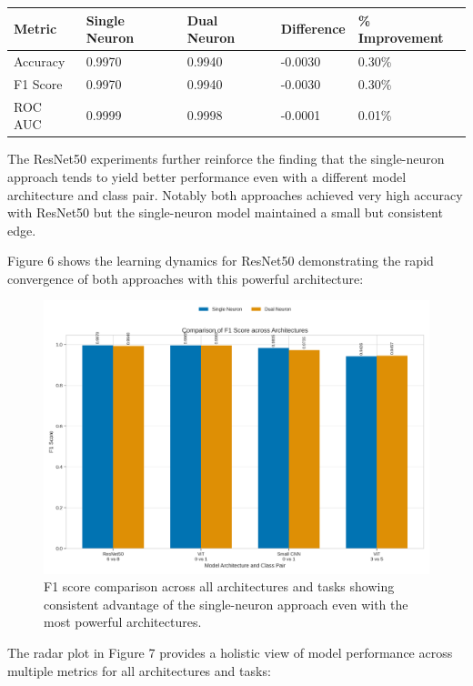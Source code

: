 \documentclass[11pt]{article}
\begin{document}
\begin{tabular}{lllll}
\hline
Metric & Single Neuron & Dual Neuron & Difference & \% Improvement \\
\hline
Accuracy & 0.9970 & 0.9940 & -0.0030 & 0.30\% \\
F1 Score & 0.9970 & 0.9940 & -0.0030 & 0.30\% \\
ROC AUC & 0.9999 & 0.9998 & -0.0001 & 0.01\% \\
\hline
\end{tabular}

The ResNet50 experiments further reinforce the finding that the single-neuron approach tends to yield better performance even with a different model architecture and class pair. Notably both approaches achieved very high accuracy with ResNet50 but the single-neuron model maintained a small but consistent edge.

Figure 6 shows the learning dynamics for ResNet50 demonstrating the rapid convergence of both approaches with this powerful architecture:

\begin{figure}[htbp]
\centering
\includegraphics[width=\textwidth]{figures/f1_score_comparison.png}
\caption{F1 score comparison across all architectures and tasks showing consistent advantage of the single-neuron approach even with the most powerful architectures.}
\end{figure}

The radar plot in Figure 7 provides a holistic view of model performance across multiple metrics for all architectures and tasks:
\end{document}
